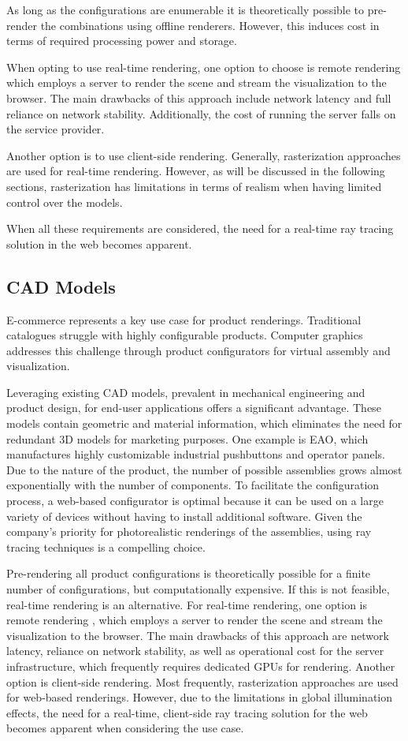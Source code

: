 As long as the configurations are enumerable it is theoretically possible to pre-render the combinations using offline renderers. However, this induces cost in terms of required processing power and storage.

When opting to use real-time rendering, one option to choose is remote rendering which employs a server to render the scene and stream the visualization to the browser. The main drawbacks of this approach include network latency and full reliance on network stability. Additionally, the cost of running the server falls on the service provider.

Another option is to use client-side rendering. Generally, rasterization approaches are used for real-time rendering. However, as will be discussed in the following sections, rasterization has limitations in terms of realism when having limited control over the models.

When all these requirements are considered, the need for a real-time ray tracing solution in the web becomes apparent.

\subsection{CAD Models}

E-commerce represents a key use case for product renderings. Traditional catalogues struggle with highly configurable products. Computer graphics addresses this challenge through product configurators for virtual assembly and visualization.

Leveraging existing CAD models, prevalent in mechanical engineering and product design, for end-user applications offers a significant advantage. These models contain geometric and material information, which eliminates the need for redundant 3D models for marketing purposes. One example is EAO, which manufactures highly customizable industrial pushbuttons and operator panels. Due to the nature of the product, the number of possible assemblies grows almost exponentially with the number of components. To facilitate the configuration process, a web-based configurator is optimal because it can be used on a large variety of devices without having to install additional software. Given the company's priority for photorealistic renderings of the assemblies, using ray tracing techniques is a compelling choice.

Pre-rendering all product configurations is theoretically possible for a finite number of configurations, but computationally expensive. If this is not feasible, real-time rendering is an alternative. For real-time rendering, one option is remote rendering \cite{remoteRendering}, which employs a server to render the scene and stream the visualization to the browser. The main drawbacks of this approach are network latency, reliance on network stability, as well as operational cost for the server infrastructure, which frequently requires dedicated GPUs for rendering. Another option is client-side rendering. Most frequently, rasterization approaches are used for web-based renderings. However, due to the limitations in global illumination effects, the need for a real-time, client-side ray tracing solution for the web becomes apparent when considering the use case.

